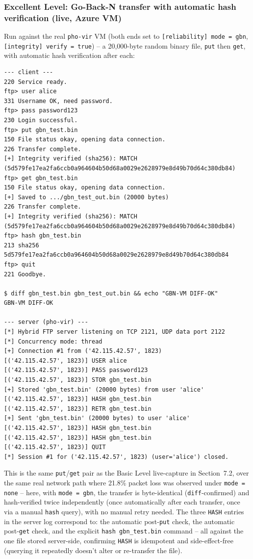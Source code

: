 \documentclass[11pt]{article}
\begin{document}
\subsubsection{Excellent Level: Go-Back-N transfer with automatic hash verification (live, Azure VM)}
Run against the real \texttt{pho-vir} VM (both ends set to
\texttt{[reliability] mode = gbn}, \texttt{[integrity] verify = true}) -- a
20{,}000-byte random binary file, \texttt{put} then \texttt{get}, with automatic
hash verification after each:
\begin{lstlisting}
--- client ---
220 Service ready.
ftp> user alice
331 Username OK, need password.
ftp> pass password123
230 Login successful.
ftp> put gbn_test.bin
150 File status okay, opening data connection.
226 Transfer complete.
[+] Integrity verified (sha256): MATCH (5d579fe17ea2fa6ccb0a964604b50d68a0029e2628979e8d49b70d64c380db84)
ftp> get gbn_test.bin
150 File status okay, opening data connection.
[+] Saved to .../gbn_test_out.bin (20000 bytes)
226 Transfer complete.
[+] Integrity verified (sha256): MATCH (5d579fe17ea2fa6ccb0a964604b50d68a0029e2628979e8d49b70d64c380db84)
ftp> hash gbn_test.bin
213 sha256 5d579fe17ea2fa6ccb0a964604b50d68a0029e2628979e8d49b70d64c380db84
ftp> quit
221 Goodbye.

$ diff gbn_test.bin gbn_test_out.bin && echo "GBN-VM DIFF-OK"
GBN-VM DIFF-OK

--- server (pho-vir) ---
[*] Hybrid FTP server listening on TCP 2121, UDP data port 2122
[*] Concurrency mode: thread
[+] Connection #1 from ('42.115.42.57', 1823)
[('42.115.42.57', 1823)] USER alice
[('42.115.42.57', 1823)] PASS password123
[('42.115.42.57', 1823)] STOR gbn_test.bin
[+] Stored 'gbn_test.bin' (20000 bytes) from user 'alice'
[('42.115.42.57', 1823)] HASH gbn_test.bin
[('42.115.42.57', 1823)] RETR gbn_test.bin
[+] Sent 'gbn_test.bin' (20000 bytes) to user 'alice'
[('42.115.42.57', 1823)] HASH gbn_test.bin
[('42.115.42.57', 1823)] HASH gbn_test.bin
[('42.115.42.57', 1823)] QUIT
[*] Session #1 for ('42.115.42.57', 1823) (user='alice') closed.
\end{lstlisting}
This is the same \texttt{put}/\texttt{get} pair as the Basic Level live-capture
in Section~7.2, over the same real network path where 21.8\% packet loss was
observed under \texttt{mode = none} -- here, with \texttt{mode = gbn}, the
transfer is byte-identical (\texttt{diff}-confirmed) and hash-verified twice
independently (once automatically after each transfer, once via a manual
\texttt{hash} query), with no manual retry needed. The three \texttt{HASH}
entries in the server log correspond to: the automatic post-\texttt{put} check,
the automatic post-\texttt{get} check, and the explicit \texttt{hash gbn\_test.bin}
command -- all against the one file stored server-side, confirming
\texttt{HASH} is idempotent and side-effect-free (querying it repeatedly
doesn't alter or re-transfer the file).
\end{document}
